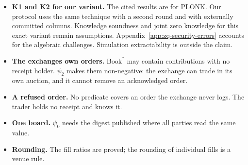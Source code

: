 \begin{itemize}
\item
  \textbf{K1 and K2 for our variant.} The cited results are for PLONK. Our protocol uses the same technique with a second round and with externally committed columns. Knowledge soundness and joint zero knowledge for this exact variant remain assumptions. Appendix~\ref{app:zq-security-errors} accounts for the algebraic challenges. Simulation extractability is outside the claim.
\item
  \textbf{The exchange\textquotesingle s own orders.} \(\text{Book}^*\) may contain contributions with no receipt holder. \(\psi_2\) makes them non-negative: the exchange can trade in its own auction, and it cannot remove an acknowledged order.
\item
  \textbf{A refused order.} No predicate covers an order the exchange never logs. The trader holds no receipt and knows it.
\item
  \textbf{One board.} \(\psi_0\) needs the digest published where all parties read the same value.
\item
  \textbf{Rounding.} The fill ratios are proved; the rounding of individual fills is a venue rule.
\end{itemize}




